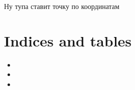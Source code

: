 \documentclass[a4paper,10pt,russian]{sphinxmanual}
\begin{document}
\begin{fulllineitems}
\label{\detokenize{index:display.draw_pixel}}
\pysigstartsignatures
{}
\pysigstopsignatures
\sphinxAtStartPar
{}

\sphinxAtStartPar
Ну тупа ставит точку по координатам

\end{fulllineitems}



\section{Indices and tables}
\label{\detokenize{index:indices-and-tables}}\begin{itemize}
\item {} 
\sphinxAtStartPar
{}

\item {} 
\sphinxAtStartPar
{}

\item {} 
\sphinxAtStartPar
{}

\end{itemize}


\renewcommand{\indexname}{Содержание модулей Python}
\begin{sphinxtheindex}
\let\bigletter\sphinxstyleindexlettergroup
\bigletter{c}
\item\relax{}
\indexspace
\bigletter{d}
\item\relax{}
\indexspace
\bigletter{f}
\item\relax{}
\indexspace
\bigletter{m}
\item\relax{}
\end{sphinxtheindex}

\renewcommand{\indexname}{Алфавитный указатель}
\printindex
\end{document}
